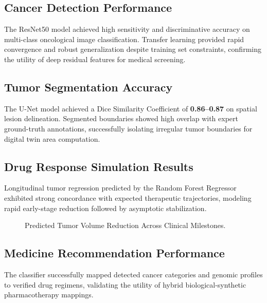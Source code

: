 \documentclass[conference]{IEEEtran}
\begin{document}
\subsection{Cancer Detection Performance}
The ResNet50 model achieved high sensitivity and discriminative accuracy on multi-class oncological image classification. Transfer learning provided rapid convergence and robust generalization despite training set constraints, confirming the utility of deep residual features for medical screening.

\subsection{Tumor Segmentation Accuracy}
The U-Net model achieved a Dice Similarity Coefficient of \textbf{0.86--0.87} on spatial lesion delineation. Segmented boundaries showed high overlap with expert ground-truth annotations, successfully isolating irregular tumor boundaries for digital twin area computation.

\subsection{Drug Response Simulation Results}
Longitudinal tumor regression predicted by the Random Forest Regressor exhibited strong concordance with expected therapeutic trajectories, modeling rapid early-stage reduction followed by asymptotic stabilization.

\begin{figure}[htbp]
\centering
{}
\caption{Predicted Tumor Volume Reduction Across Clinical Milestones.}
\label{fig:bar_reduction}
\end{figure}

\subsection{Medicine Recommendation Performance}
The classifier successfully mapped detected cancer categories and genomic profiles to verified drug regimens, validating the utility of hybrid biological-synthetic pharmacotherapy mappings.
\end{document}

